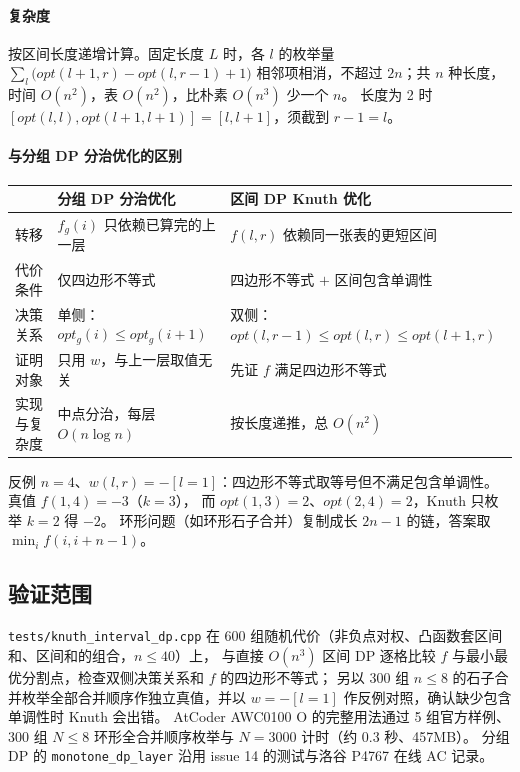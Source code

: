 \paragraph{复杂度} 按区间长度递增计算。固定长度 $L$ 时，各 $l$ 的枚举量
$\sum_l\bigl(opt(l+1,r)-opt(l,r-1)+1\bigr)$ 相邻项相消，不超过 $2n$；共 $n$ 种长度，时间 $O(n^2)$，表 $O(n^2)$，比朴素 $O(n^3)$ 少一个 $n$。
长度为 2 时 $[opt(l,l),opt(l+1,l+1)]=[l,l+1]$，须截到 $r-1=l$。

\paragraph{与分组 DP 分治优化的区别}
\begin{center}\small
\begin{tabular}{@{}lll@{}}
\toprule
& 分组 DP 分治优化 & 区间 DP Knuth 优化\\
\midrule
转移 & $f_g(i)$ 只依赖已算完的上一层 & $f(l,r)$ 依赖同一张表的更短区间\\
代价条件 & 仅四边形不等式 & 四边形不等式 $+$ 区间包含单调性\\
决策关系 & 单侧：$opt_g(i)\le opt_g(i+1)$ & 双侧：$opt(l,r-1)\le opt(l,r)\le opt(l+1,r)$\\
证明对象 & 只用 $w$，与上一层取值无关 & 先证 $f$ 满足四边形不等式\\
实现与复杂度 & 中点分治，每层 $O(n\log n)$ & 按长度递推，总 $O(n^2)$\\
\bottomrule
\end{tabular}
\end{center}
反例 $n=4$、$w(l,r)=-[l=1]$：四边形不等式取等号但不满足包含单调性。真值 $f(1,4)=-3$（$k=3$），
而 $opt(1,3)=2$、$opt(2,4)=2$，Knuth 只枚举 $k=2$ 得 $-2$。
环形问题（如环形石子合并）复制成长 $2n-1$ 的链，答案取 $\min_i f(i,i+n-1)$。

\subsection{验证范围}
\texttt{tests/knuth\_interval\_dp.cpp} 在 600 组随机代价（非负点对权、凸函数套区间和、区间和的组合，$n\le40$）上，
与直接 $O(n^3)$ 区间 DP 逐格比较 $f$ 与最小最优分割点，检查双侧决策关系和 $f$ 的四边形不等式；
另以 300 组 $n\le8$ 的石子合并枚举全部合并顺序作独立真值，并以 $w=-[l=1]$ 作反例对照，确认缺少包含单调性时 Knuth 会出错。
AtCoder AWC0100 O 的完整用法通过 5 组官方样例、300 组 $N\le8$ 环形全合并顺序枚举与 $N=3000$ 计时（约 0.3 秒、457MB）。
分组 DP 的 \texttt{monotone\_dp\_layer} 沿用 issue 14 的测试与洛谷 P4767 在线 AC 记录。
